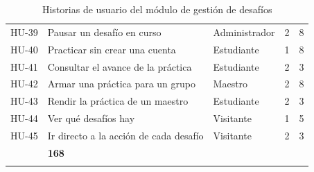 \begin{longtable}{l >{\raggedright\arraybackslash}p{6.9cm} >{\raggedright\arraybackslash}p{2.4cm} c c}
HU-39 & Pausar un desafío en curso & Administrador & 2 & 8 \\
HU-40 & Practicar sin crear una cuenta & Estudiante & 1 & 8 \\
HU-41 & Consultar el avance de la práctica & Estudiante & 2 & 3 \\
HU-42 & Armar una práctica para un grupo & Maestro & 2 & 8 \\
HU-43 & Rendir la práctica de un maestro & Estudiante & 2 & 3 \\
HU-44 & Ver qué desafíos hay & Visitante & 1 & 5 \\
HU-45 & Ir directo a la acción de cada desafío & Visitante & 2 & 3 \\
\arrayrulecolor{hulinea}\midrule
\multicolumn{4}{r}{\textbf{Total de puntos}} & \textbf{168} \\
\arrayrulecolor{hulinea}\bottomrule
\rowcolor{white}\caption{Historias de usuario del módulo de gestión de desafíos}\label{tab:historias_desafios}\\
\end{longtable}
